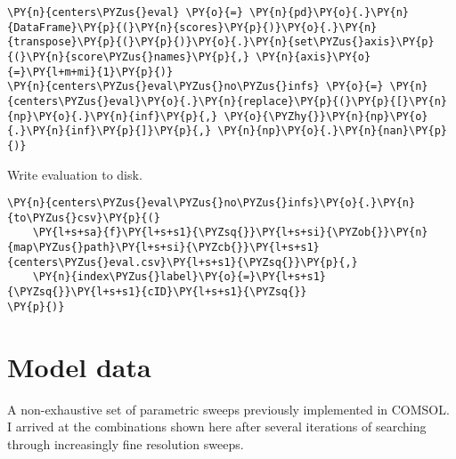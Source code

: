 \begin{tcolorbox}[breakable, size=fbox, boxrule=1pt, pad at break*=1mm,colback=cellbackground, colframe=cellborder]
\begin{Verbatim}[commandchars=\\\{\}]
\PY{n}{centers\PYZus{}eval} \PY{o}{=} \PY{n}{pd}\PY{o}{.}\PY{n}{DataFrame}\PY{p}{(}\PY{n}{scores}\PY{p}{)}\PY{o}{.}\PY{n}{transpose}\PY{p}{(}\PY{p}{)}\PY{o}{.}\PY{n}{set\PYZus{}axis}\PY{p}{(}\PY{n}{score\PYZus{}names}\PY{p}{,} \PY{n}{axis}\PY{o}{=}\PY{l+m+mi}{1}\PY{p}{)}
\PY{n}{centers\PYZus{}eval\PYZus{}no\PYZus{}infs} \PY{o}{=} \PY{n}{centers\PYZus{}eval}\PY{o}{.}\PY{n}{replace}\PY{p}{(}\PY{p}{[}\PY{n}{np}\PY{o}{.}\PY{n}{inf}\PY{p}{,} \PY{o}{\PYZhy{}}\PY{n}{np}\PY{o}{.}\PY{n}{inf}\PY{p}{]}\PY{p}{,} \PY{n}{np}\PY{o}{.}\PY{n}{nan}\PY{p}{)}
\end{Verbatim}
\end{tcolorbox}

    Write evaluation to disk.

    \begin{tcolorbox}[breakable, size=fbox, boxrule=1pt, pad at break*=1mm,colback=cellbackground, colframe=cellborder]
\begin{Verbatim}[commandchars=\\\{\}]
\PY{n}{centers\PYZus{}eval\PYZus{}no\PYZus{}infs}\PY{o}{.}\PY{n}{to\PYZus{}csv}\PY{p}{(}
    \PY{l+s+sa}{f}\PY{l+s+s1}{\PYZsq{}}\PY{l+s+si}{\PYZob{}}\PY{n}{map\PYZus{}path}\PY{l+s+si}{\PYZcb{}}\PY{l+s+s1}{centers\PYZus{}eval.csv}\PY{l+s+s1}{\PYZsq{}}\PY{p}{,}
    \PY{n}{index\PYZus{}label}\PY{o}{=}\PY{l+s+s1}{\PYZsq{}}\PY{l+s+s1}{cID}\PY{l+s+s1}{\PYZsq{}}
\PY{p}{)}
\end{Verbatim}
\end{tcolorbox}

    \hypertarget{model-data}{%
\section{Model data}\label{model-data}}

    A non-exhaustive set of parametric sweeps previously implemented in
COMSOL. I arrived at the combinations shown here after several
iterations of searching through increasingly fine resolution sweeps.

